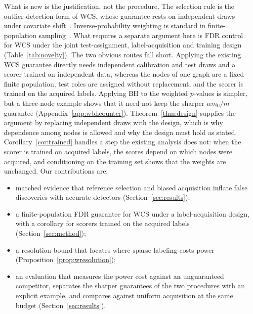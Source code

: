 \documentclass[twoside]{article}
\begin{document}
What is new is the justification, not the procedure. The selection rule is the outlier-detection form of WCS, whose guarantee rests on independent draws under covariate shift~\citep{jin2026weighted}. Inverse-probability weighting is standard in finite-population sampling~\citep{horvitz1952generalization}. What requires a separate argument here is FDR control for WCS under the joint test-assignment, label-acquisition and training design (Table~\ref{tab:novelty}). The two obvious routes fall short. Applying the existing WCS guarantee directly needs independent calibration and test draws and a scorer trained on independent data, whereas the nodes of one graph are a fixed finite population, test roles are assigned without replacement, and the scorer is trained on the acquired labels. Applying BH to the weighted $p$-values is simpler, but a three-node example shows that it need not keep the sharper $\alpha m_0/m$ guarantee (Appendix~\ref{app:wbhcounter}). Theorem~\ref{thm:design} supplies the argument by replacing independent draws with the design, which is why dependence among nodes is allowed and why the design must hold as stated. Corollary~\ref{cor:trained} handles a step the existing analysis does not: when the scorer is trained on acquired labels, the scores depend on which nodes were acquired, and conditioning on the training set shows that the weights are unchanged. Our contributions are:
\begin{itemize}\setlength{\itemsep}{0pt}\setlength{\parskip}{0pt}
\item matched evidence that reference selection and biased acquisition inflate false discoveries with accurate detectors (Section~\ref{sec:results});
\item a finite-population FDR guarantee for WCS under a label-acquisition design, with a corollary for scorers trained on the acquired labels (Section~\ref{sec:method});
\item a resolution bound that locates where sparse labeling costs power (Proposition~\ref{prop:wresolution});
\item an evaluation that measures the power cost against an unguaranteed competitor, separates the sharper guarantees of the two procedures with an explicit example, and compares against uniform acquisition at the same budget (Section~\ref{sec:results}).
\end{itemize}
\end{document}
